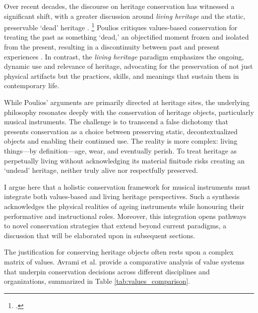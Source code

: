 Over recent decades, the discourse on heritage conservation has witnessed a significant shift, with a greater discussion around \emph{living heritage} and the static, preservable `dead' heritage \cite{poulios_moving_2010,smith_uses_2006}. 
\footcite[\textit{`a handful dismissed the idea of heritage as a negative idea, noting for instance that heritage was ‘keeping that which aught to be alive dead.}' What about keeping that which aught to be dead alive][]{smith_uses_2006}
Poulios critiques values-based conservation for treating the past as something `dead,' an objectified moment frozen and isolated from the present, resulting in a discontinuity between past and present experiences \cite{poulios_moving_2010}. In contrast, the \emph{living heritage} paradigm emphasizes the ongoing, dynamic use and relevance of heritage, advocating for the preservation of not just physical artifacts but the practices, skills, and meanings that sustain them in contemporary life.

While Poulios' arguments are primarily directed at heritage sites, the underlying philosophy resonates deeply with the conservation of heritage objects, particularly musical instruments. The challenge is to transcend a false dichotomy that presents conservation as a choice between preserving static, decontextualized objects and enabling their continued use. The reality is more complex: living things—by definition—age, wear, and eventually perish. To treat heritage as perpetually living without acknowledging its material finitude risks creating an `undead' heritage, neither truly alive nor respectfully preserved.

I argue here that a holistic conservation framework for musical instruments must integrate both values-based and living heritage perspectives. Such a synthesis acknowledges the physical realities of ageing instruments while honouring their performative and instructional roles. Moreover, this integration opens pathways to novel conservation strategies that extend beyond current paradigms, a discussion that will be elaborated upon in subsequent sections.


The justification for conserving heritage objects often rests upon a complex matrix of values. Avrami et al. \cite{avrami_values_2000} provide a comparative analysis of value systems that underpin conservation decisions across different disciplines and organizations, summarized in Table \ref{tab:values_comparison}.

